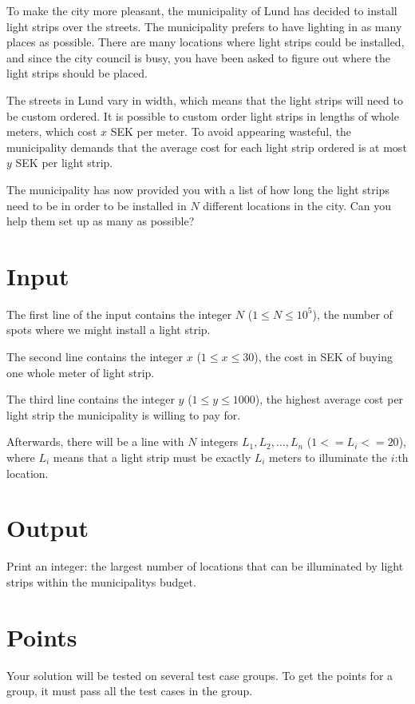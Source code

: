 To make the city more pleasant, the municipality of Lund has decided to install light strips
over the streets. The municipality prefers to have lighting in as many places as possible.
There are many locations where light strips could be installed, and since the city council
is busy, you have been asked to figure out where the light strips should be placed.


The streets in Lund vary in width, which means that the light strips will need to be
custom ordered. It is possible to custom order light strips in lengths of whole meters,
which cost $x$ SEK per meter. To avoid appearing wasteful, the municipality demands that the
average cost for each light strip ordered is at most $y$ SEK per light strip.

The municipality has now provided you with a list of how long the light strips need to
be in order to be installed in $N$ different locations in the city. Can you help them set up as many as possible?


\section*{Input}
The first line of the input contains the integer $N$ ($1 \le N \le 10^5$), the number of spots
where we might install a light strip.

The second line contains the integer $x$ ($1 \leq x \leq 30$), the cost in SEK of buying one whole meter of light strip.

The third line contains the integer $y$ ($1 \le y \le 1000$), the highest average cost per light strip the
municipality is willing to pay for.

Afterwards, there will be a line with $N$ integers $L_1, L_2, \dots, L_n$ ($1<=L_i<=20$), where $L_i$ means that
a light strip must be exactly $L_i$ meters to illuminate the $i$:th location.


\section*{Output}
Print an integer: the largest number of locations that can be illuminated by light strips within the municipalitys budget.

\section*{Points}
Your solution will be tested on several test case groups.
To get the points for a group, it must pass all the test cases in the group.

